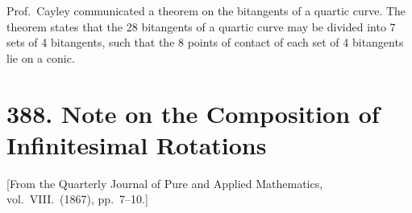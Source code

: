 \documentclass[12pt,a4paper]{article}
\theoremstyle{plain}
\theoremstyle{definition}
\theoremstyle{remark}
\begin{document}
Prof.~Cayley communicated a theorem on the bitangents of a quartic curve. The theorem states that the 28 bitangents of a quartic curve may be divided into 7 sets of 4 bitangents, such that the 8 points of contact of each set of 4 bitangents lie on a conic.



\section*{388. Note on the Composition of Infinitesimal Rotations}

\begin{center}
\small [From the Quarterly Journal of Pure and Applied Mathematics, vol.~VIII.\ (1867), pp.~7--10.]
\end{center}
\end{document}
